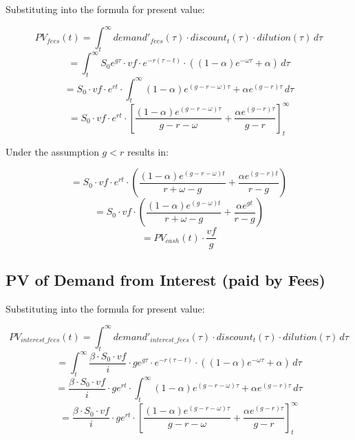 Substituting into the formula for present value:

\begin{equation}
    PV_{fees}(t) = \int_{t}^{\infty} demand'_{fees}(\tau) \cdot discount_t(\tau) \cdot dilution(\tau) \,d\tau
\end{equation}
\begin{equation}
    = \int_{t}^{\infty} S_0e^{g\tau}\cdot vf \cdot e^{-r(\tau-t)} \cdot ((1-\alpha)e^{-\omega\tau} + \alpha) \,d\tau
\end{equation}
\begin{equation}
    = S_0\cdot vf \cdot e^{rt} \cdot \int_{t}^{\infty}  (1-\alpha)e^{(g-r-\omega)\tau} + \alpha e^{(g-r)\tau} \,d\tau
\end{equation}
\begin{equation}
    = S_0\cdot vf \cdot e^{rt} \cdot \left[ \frac{(1-\alpha)e^{(g-r-\omega)\tau}}{g-r-\omega} + \frac{\alpha e^{(g-r)\tau}}{g-r} \right]_{t}^{\infty}
\end{equation}

Under the assumption $g < r$ results in:

\begin{equation}
    = S_0\cdot vf \cdot e^{rt} \cdot \left( \frac{(1-\alpha)e^{(g-r-\omega)t}}{r+\omega-g} + \frac{\alpha e^{(g-r)t}}{r-g} \right)
\end{equation}
\begin{equation}
    = S_0\cdot vf \cdot \left( \frac{(1-\alpha)e^{(g-\omega)t}}{r+\omega-g} + \frac{\alpha e^{gt}}{r-g} \right)
\end{equation}
\begin{equation}
    = PV_{cash}(t) \cdot \frac{vf}{g}
\end{equation}

\subsection{PV of Demand from Interest (paid by Fees)}

Substituting into the formula for present value:

\begin{equation}
    PV_{interest\_fees}(t) = \int_{t}^{\infty} demand'_{interest\_fees}(\tau) \cdot discount_t(\tau) \cdot dilution(\tau) \,d\tau
\end{equation}
\begin{equation}
    = \int_{t}^{\infty} \frac{\beta \cdot S_0\cdot vf}{i} \cdot ge^{g\tau} \cdot e^{-r(\tau-t)} \cdot ((1-\alpha)e^{-\omega\tau} + \alpha) \,d\tau
\end{equation}
\begin{equation}
    = \frac{\beta \cdot S_0\cdot vf}{i} \cdot ge^{rt} \cdot \int_{t}^{\infty}  (1-\alpha)e^{(g-r-\omega)\tau} + \alpha e^{(g-r)\tau} \,d\tau
\end{equation}
\begin{equation}
    = \frac{\beta \cdot S_0\cdot vf}{i} \cdot ge^{rt} \cdot \left[ \frac{(1-\alpha)e^{(g-r-\omega)\tau}}{g-r-\omega} + \frac{\alpha e^{(g-r)\tau}}{g-r} \right]_{t}^{\infty}
\end{equation}

